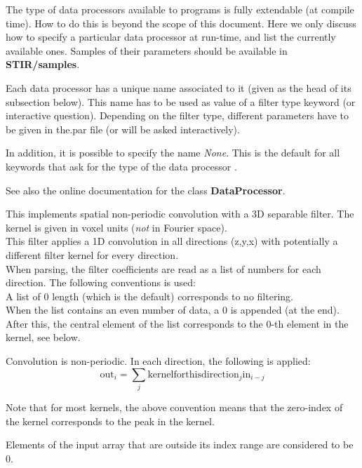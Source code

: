 \documentclass{article}
\newcommand{\tab}{\hspace{5mm}}
\begin{document}
The type of data processors 
available to programs is fully extendable (at compile time). 
How to do this is beyond the scope of this document. Here we 
only discuss how to specify a particular data processor at run-time, 
and list the currently available ones. Samples of their parameters 
should be available in \textbf{STIR/samples}.


Each data processor has a unique name associated to it (given 
as the head of its subsection below). This name has to be used 
as value of a filter type keyword (or interactive question). 
Depending on the filter type, different parameters have to be 
given in the.par file (or will be asked interactively).


In addition, it is possible to specify the name \textit{None}. This 
is the default for all keywords that ask for the type of 
the data processor .


See also the online documentation for the class \textbf{DataProcessor}.

{ 
}

This implements spatial non-periodic convolution with a 3D separable 
filter. The kernel is given in voxel units (\textit{not} in Fourier 
space).\\
This filter applies a 1D convolution in all directions (z,y,x) 
with potentially a different filter kernel for every direction.\\
When parsing, the filter coefficients are read as a list of numbers 
for each direction. The following conventions is used:\\
{\textbullet}\tab 
A list of 0 length (which is the default) corresponds to no filtering.\\
{\textbullet}\tab When the list contains an even number of data, a 0 is 
appended (at the end).\\
{\textbullet}\tab 
After this, the central element of the list corresponds to the 
0-th element in the kernel, see below.


Convolution is non-periodic. In each direction, the following 
is applied: 
\[
\mathrm{out}_i = \sum_{j} \mathrm{kernelforthisdirection}_{j} \mathrm{in}_{i-j}
\]

Note that for most kernels, the above convention means that the 
zero-index of the kernel corresponds to the peak in the kernel. 



Elements of the input array that are outside its index range 
are considered to be 0. 
\end{document}

